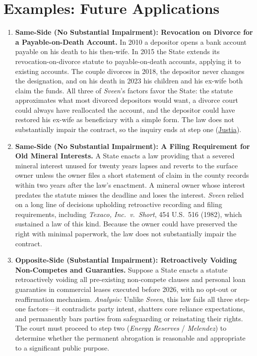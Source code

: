 \documentclass[12pt]{article}
\begin{document}
\section{Examples: Future Applications}
\begin{enumerate}

\item \textbf{Same-Side (No Substantial Impairment): Revocation on Divorce for a Payable-on-Death Account.} In 2010 a depositor opens a bank account payable on his death to his then-wife. In 2015 the State extends its revocation-on-divorce statute to payable-on-death accounts, applying it to existing accounts. The couple divorces in 2018, the depositor never changes the designation, and on his death in 2023 his children and his ex-wife both claim the funds. All three of \textit{Sveen}'s factors favor the State: the statute approximates what most divorced depositors would want, a divorce court could always have reallocated the account, and the depositor could have restored his ex-wife as beneficiary with a simple form. The law does not substantially impair the contract, so the inquiry ends at step one (\href{https://supreme.justia.com/cases/federal/us/584/16-1432/}{Justia}).

\item \textbf{Same-Side (No Substantial Impairment): A Filing Requirement for Old Mineral Interests.} A State enacts a law providing that a severed mineral interest unused for twenty years lapses and reverts to the surface owner unless the owner files a short statement of claim in the county records within two years after the law's enactment. A mineral owner whose interest predates the statute misses the deadline and loses the interest. \textit{Sveen} relied on a long line of decisions upholding retroactive recording and filing requirements, including \textit{Texaco, Inc.\ v.\ Short}, 454 U.S.\ 516 (1982), which sustained a law of this kind. Because the owner could have preserved the right with minimal paperwork, the law does not substantially impair the contract.

\item \textbf{Opposite-Side (Substantial Impairment): Retroactively Voiding Non-Competes and Guaranties.} Suppose a State enacts a statute retroactively voiding all pre-existing non-compete clauses and personal loan guaranties in commercial leases executed before 2026, with no opt-out or reaffirmation mechanism. \textit{Analysis:} Unlike \textit{Sveen}, this law fails all three step-one factors---it contradicts party intent, shatters core reliance expectations, and permanently bars parties from safeguarding or reinstating their rights. The court must proceed to step two (\textit{Energy Reserves} / \textit{Melendez}) to determine whether the permanent abrogation is reasonable and appropriate to a significant public purpose.


\end{enumerate}
\end{document}
